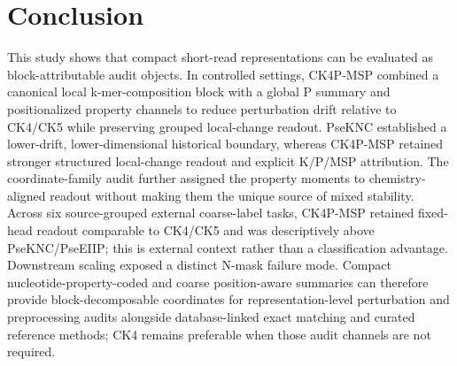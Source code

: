 \FloatBarrier
\section{Conclusion}

This study shows that compact short-read representations can be evaluated as block-attributable audit objects. In controlled settings, CK4P-MSP combined a canonical local k-mer-composition block with a global P summary and positionalized property channels to reduce perturbation drift relative to CK4/CK5 while preserving grouped local-change readout. PseKNC established a lower-drift, lower-dimensional historical boundary, whereas CK4P-MSP retained stronger structured local-change readout and explicit K/P/MSP attribution. The coordinate-family audit further assigned the property moments to chemistry-aligned readout without making them the unique source of mixed stability. Across six source-grouped external coarse-label tasks, CK4P-MSP retained fixed-head readout comparable to CK4/CK5 and was descriptively above PseKNC/PseEIIP; this is external context rather than a classification advantage. Downstream scaling exposed a distinct N-mask failure mode. Compact nucleotide-property-coded and coarse position-aware summaries can therefore provide block-decomposable coordinates for representation-level perturbation and preprocessing audits alongside database-linked exact matching and curated reference methods; CK4 remains preferable when those audit channels are not required.
